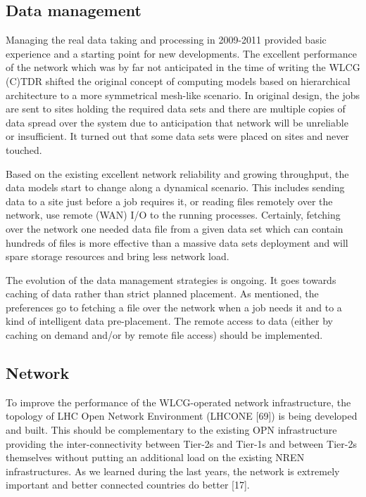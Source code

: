 \documentclass{intech}
\begin{document}
\subsection{Data management}
%
Managing the real data taking and processing in 2009-2011 provided
basic experience and a starting point for new developments. The
excellent performance of the network which was by far not
anticipated in the time of writing the WLCG (C)TDR shifted the
original concept of  computing models based on hierarchical
architecture to a more symmetrical mesh-like scenario. In original
design, the jobs are sent to sites holding the required data sets
and there are multiple copies of data spread over the system due to
anticipation that network will be unreliable or insufficient. It
turned out that some data sets were placed on sites and never
touched.

Based on the existing excellent network reliability and growing
throughput, the data models start to change along a dynamical
scenario. This includes sending data to a site just before a job
requires it, or reading files remotely over the network, use remote
(WAN) I/O to the running processes. Certainly, fetching over the
network one needed data file from a given data set which can contain
hundreds of files is more effective than a massive data sets
deployment and will spare storage resources and bring less network
load.

The evolution of the data management strategies is ongoing. It goes
towards caching of data rather than strict planned placement.  As
mentioned, the preferences go to fetching a file over the network
when a job needs it and to a kind of intelligent data pre-placement.
The remote access to data (either by caching on demand and/or by
remote file access) should be implemented.

\subsection{Network}
%
To improve the performance of the WLCG-operated network
infrastructure, the topology of LHC Open Network Environment (LHCONE [69])
is being developed and
built. This should be complementary to the existing OPN
infrastructure providing the inter-connectivity between Tier-2s and
Tier-1s and between Tier-2s themselves without putting an additional
load on the existing NREN infrastructures. As we learned during the
last years, the network is extremely important and better connected
countries do better [17].
\end{document}
